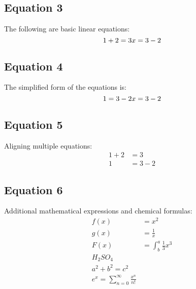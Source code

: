 \documentclass[12pt,a4paper]{article}
\begin{document}
	\subsection{Equation 3}
	The following are basic linear equations:
	\begin{equation}
		1+2=3 \\
		x=3-2
	\end{equation}
	
	\subsection{Equation 4}
	The simplified form of the equations is:
	\begin{equation*}
		1=3-2 \\
		x=3-2
	\end{equation*}
	
	\subsection{Equation 5}
	Aligning multiple equations:
	\begin{align*}
		1+2 &= 3 \\
		1 &= 3-2
	\end{align*}
	
	\subsection{Equation 6}
	Additional mathematical expressions and chemical formulas:
	\begin{align*}
		f(x) &= x^2 \\
		g(x) &=  \frac{1}{x} \\
		F(x) &= \int_{b}^{a} \frac{1}{3}x^3 \\
		H_{2}SO_{4} \\
		a^2 + b^2 = c^2 \\
		e^x = \sum_{n=0}^{\infty} \frac{x^n}{n!}
	\end{align*}
    
    
\end{document}
